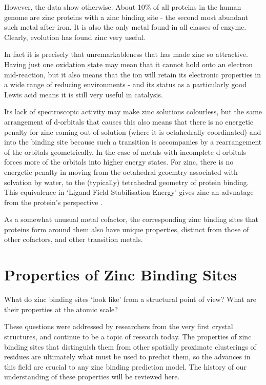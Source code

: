 However, the data show otherwise. About 10\% of all proteins in the human genome are zinc proteins with a zinc binding site \cite{andreini2006counting} - the second most abundant such metal after iron. It is also the only metal found in all classes of enzyme. Clearly, evolution has found zinc very useful.

In fact it is precisely that unremarkableness that has made zinc so attractive. Having just one oxidation state may mean that it cannot hold onto an electron mid-reaction, but it also means that the ion will retain its electronic properties in a wide range of reducing environments - and its status as a particularly good Lewis acid means it is still very useful in catalysis. 

Its lack of spectroscopic activity may make zinc solutions colourless, but the same arrangement of d-orbitals that causes this also means that there is no energetic penalty for zinc coming out of solution (where it is octahedrally coordinated) and into the binding site because such a transition is accompanies by a rearrangement of the orbitals geometrically. In the case of metals with incomplete d-orbitals forces more of the orbitals into higher energy states. For zinc, there is no energetic penalty in moving from the octahedral geoemtry associated with solvation by water, to the (typically) tetrahedral geometry of protein binding. This equivalence in `Ligand Field Stabilisation Energy' gives zinc an advnatage from the protein's perspective \cite{lachenmann2004zinc}.

As a somewhat unusual metal cofactor, the corresponding zinc binding sites that proteins form around them also have unique properties, distinct from those of other cofactors, and other transition metals.

\section{Properties of Zinc Binding Sites}

What do zinc binding sites `look like' from a structural point of view? What are their properties at the atomic scale?

These questions were addressed by researchers from the very first crystal structures, and continue to be a topic of research today. The properties of zinc binding sites that distinguish them from other spatially proximate clusterings of residues are ultimately what must be used to predict them, so the advances in this field are crucial to any zinc binding prediction model. The history of our understanding of these properties will be reviewed here.

